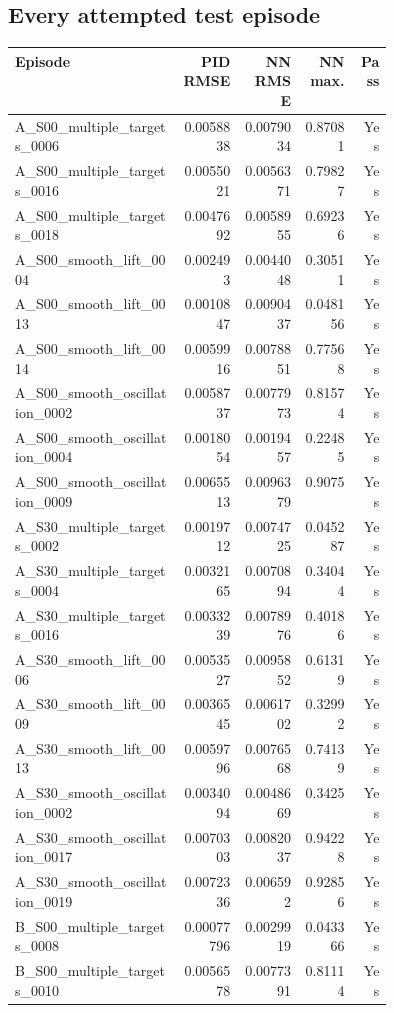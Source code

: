 \subsection*{Every attempted test episode}
\begin{longtable}{p{0.44\linewidth}rrrr}
\toprule Episode & PID RMSE & NN RMSE & NN max. & Pass\\\midrule\endhead
A\_S00\_multiple\_targets\_0006 & 0.0058838 & 0.0079034 & 0.87081 & Yes\\
A\_S00\_multiple\_targets\_0016 & 0.0055021 & 0.0056371 & 0.79827 & Yes\\
A\_S00\_multiple\_targets\_0018 & 0.0047692 & 0.0058955 & 0.69236 & Yes\\
A\_S00\_smooth\_lift\_0004 & 0.002493 & 0.0044048 & 0.30511 & Yes\\
A\_S00\_smooth\_lift\_0013 & 0.0010847 & 0.0090437 & 0.048156 & Yes\\
A\_S00\_smooth\_lift\_0014 & 0.0059916 & 0.0078851 & 0.77568 & Yes\\
A\_S00\_smooth\_oscillation\_0002 & 0.0058737 & 0.0077973 & 0.81574 & Yes\\
A\_S00\_smooth\_oscillation\_0004 & 0.0018054 & 0.0019457 & 0.22485 & Yes\\
A\_S00\_smooth\_oscillation\_0009 & 0.0065513 & 0.0096379 & 0.9075 & Yes\\
A\_S30\_multiple\_targets\_0002 & 0.0019712 & 0.0074725 & 0.045287 & Yes\\
A\_S30\_multiple\_targets\_0004 & 0.0032165 & 0.0070894 & 0.34044 & Yes\\
A\_S30\_multiple\_targets\_0016 & 0.0033239 & 0.0078976 & 0.40186 & Yes\\
A\_S30\_smooth\_lift\_0006 & 0.0053527 & 0.0095852 & 0.61319 & Yes\\
A\_S30\_smooth\_lift\_0009 & 0.0036545 & 0.0061702 & 0.32992 & Yes\\
A\_S30\_smooth\_lift\_0013 & 0.0059796 & 0.0076568 & 0.74139 & Yes\\
A\_S30\_smooth\_oscillation\_0002 & 0.0034094 & 0.0048669 & 0.3425 & Yes\\
A\_S30\_smooth\_oscillation\_0017 & 0.0070303 & 0.0082037 & 0.94228 & Yes\\
A\_S30\_smooth\_oscillation\_0019 & 0.0072336 & 0.006592 & 0.92856 & Yes\\
B\_S00\_multiple\_targets\_0008 & 0.00077796 & 0.0029919 & 0.043366 & Yes\\
B\_S00\_multiple\_targets\_0010 & 0.0056578 & 0.0077391 & 0.81114 & Yes\\

\end{longtable}
